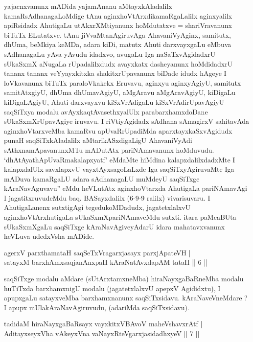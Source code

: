 
\begin{artha}
yajacnxvanunx mADida yajamAnanu aMtayxkAladalilx kamaRsAdhanagaLoMdige tAnu aginxhoVtArxdikamaRgaLalilx aginxyalilx apiRsidadx AhutigaLu utAkxrXMtiyanunx hoMdutatxve = shariVravanunx biTuTx ELutatxve. tAnu jiVvaMtanAgiruvAga AhavaniVyAginx, samitutx, dhUma, beMkiya keMDa, adara kiDi, matutx Ahuti darxvayxgaLu eMbuva sAdhanagaLu yAva yAvudu idadxvo, avugaLu Iga naSaTxvAgidadxrU sUkaSxmX aNugaLa rUpadalilxdudx avayxkatx dasheyanunx hoMdidadxrU tananx tananx veYyayxkitxka shakitxrUpavanunx biDade idudx hAgeye I loVkavanunx biTuTx paraloVkakekx Eruvavu, aginxyu aginxyAgiyU, samitutx samitAtxgiyU, dhUma dhUmavAgiyU, aMgAravu aMgAravAgiyU, kiDigaLu kiDigaLAgiyU, Ahuti darxvayxvu kiSxVrAdigaLu kiSxVrAdirUpavAgiyU saqSiTxya modalu avAyxkaqtAvasethxyalUlx parabarxhamxdoDane sUkaSxmXrUpavAgiye iruvavu. I riVtiyAgidadx sAdhana sAmagirxV sahitavAda aginxhoVtarxveMba kamaRvu apUvaRrUpadiMda aparxtayxkaSxvAgidudx punaH saqSiTxkAladalilx aMtarikASxdigaLigU AhavaniVyAdi sAthxnamApavanunxMTu mADutAtx pariNAmavanunx hoMduvudu. `dhAtAyathApUvaRmakalapxyatf' eMdaMte hiMdina kalapxdalilxdadxMte I kalapxdalUlx savxlapxvU vayxtAyxsagoLaLxde Iga saqSiTxyAgiruvaMte Iga mADuva kamaRgaLU adara sAdhanagaLU muMdeyU saqSiTxge kAraNavAguvavu'' eMdu heVLutAtx aginxhoVtarxda AhutigaLa pariNAmavAgi I jagatitxruvudeMdu baq. BASayxdalilx (6-9-9 ralilx) vivarisuvaru. I AhutigaLanenx sutxtigAgi tegedukoMDadudx, jagatetxlalxvU aginxhoVtArxhutigaLa sUkaSxmXpariNAmaveMdu sutxti. itara paMcaBUta sUkaSxmXgaLu saqSiTxge kAraNavAgiveyAdarU idara mahatavxvanunx heVLuva udedxVsha mADide.
\end{artha}

\begin{shl}
agerxV parxthamataH saqSeTxVragarxjasayx parxjApateVH | \\
satayxM barxhAmxsaqjanAnxpaH kAraNatAvxdapAM tataH \hfill ||  6 || 
\end{shl}

\begin{artha}
saqSiTxge modalu aMdare (sUtArxtamxneMba) hiraNayxgaBaRneMba modalu huTiTxda barxhamxnigU modalu (jagatetxlalxvU apepxV Agididxtu), I apupxgaLu satayxveMba barxhamxnanunx saqSiTxsidavu. kAraNaveVneMdare ? I apupx mUlakAraNavAgiruvudu, (adariMda saqSiTxsidavu).
\end{artha}

\begin{shl}
tadidaM hiraNayxgaBaRsayx \footnotemark{}vayxkitxVBAvoV maheVshavxrAtf | \\
AditayxseyxVha vAkeyxVna vaNayxRteV\s garxjasidadhxyeV \hfill ||  7 || 
\end{shl}

